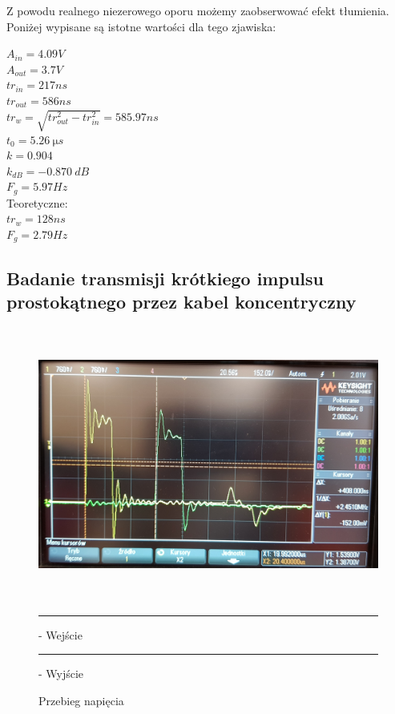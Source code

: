 \documentclass[a4paper,12pt]{article}
\newcommand\crule[3][black]{\textcolor{#1}{\rule{#2}{#3}}}
\begin{document}
\begin{justify}
Z powodu realnego niezerowego oporu możemy zaobserwować efekt tłumienia. Poniżej wypisane są istotne wartości dla tego zjawiska:
\begin{center}
$A_{in} = 4.09V$ \\
$A_{out} = 3.7V$ \\
$tr_{in} = 217ns$ \\
$tr_{out} = 586ns$ \\
$tr_{w} = \sqrt{tr_{out}^2 - tr_{in}^2} = 585.97ns$ \\
$t_{0} = \SI{5.26}{\micro s}$ \\
$k = 0.904$ \\
$k_{dB} = \SI{-0.870}{dB}$ \\
$F_{g} = 5.97Hz$ \\
Teoretyczne: \\
$tr_{w} = 128ns$ \\
$F_{g} = 2.79Hz$ \\
\end{center}

\newpage

\subsection{Badanie transmisji krótkiego impulsu prostokątnego przez kabel koncentryczny}

\begin{figure}[h]
\centering
\includegraphics[width=15cm, height=9cm]{4}
\caption{Przebieg napięcia}
\crule[yellow]{1cm}{0.4cm} - Wejście \\
\crule[green]{1cm}{0.4cm} - Wyjście \\
\end{figure}


\end{justify}
\end{document}
